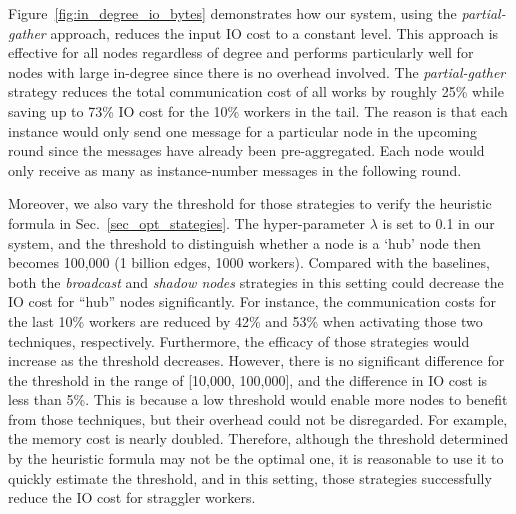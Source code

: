 \documentclass[conference]{IEEEtran}
\begin{document}
Figure~\ref{fig:in_degree_io_bytes} demonstrates how our system, using the \emph{partial-gather} approach, reduces the input IO cost to a constant level.
This approach is effective for all nodes regardless of degree and performs particularly well for nodes with large in-degree since there is no overhead involved.
The \emph{partial-gather} strategy reduces the total communication cost of all works by roughly 25\% while saving up to 73\% IO cost for the 10\% workers in the tail.
The reason is that each instance would only send one message for a particular node in the upcoming round since the messages have already been pre-aggregated.
Each node would only receive as many as instance-number messages in the following round.

Moreover, we also vary the threshold for those strategies to verify the heuristic formula in Sec.~\ref{sec_opt_stategies}.
The hyper-parameter $\lambda$ is set to 0.1 in our system, and the threshold to distinguish whether a node is a `hub' node then becomes 100,000 (1 billion edges, 1000 workers).
Compared with the baselines, both the \emph{broadcast} and \emph{shadow nodes} strategies in this setting could decrease the IO cost for ``hub'' nodes significantly.
For instance, the communication costs for the last 10\% workers are reduced by 42\% and 53\% when activating those two techniques, respectively.
Furthermore, the efficacy of those strategies would increase as the threshold decreases.
However, there is no significant difference for the threshold in the range of [10,000, 100,000], and the difference in IO cost is less than 5\%.
This is because a low threshold would enable more nodes to benefit from those techniques, but their overhead could not be disregarded.
For example, the memory cost is nearly doubled.
Therefore, although the threshold determined by the heuristic formula may not be the optimal one, it is reasonable to use it to quickly estimate the threshold, and in this setting, those strategies successfully reduce the IO cost for straggler workers.
\end{document}
